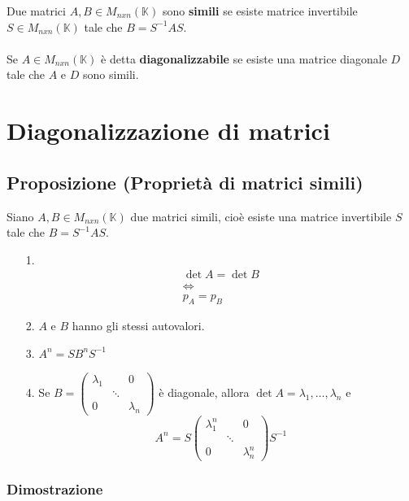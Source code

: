 \documentclass[12pt]{article}
\begin{document}
Due matrici $A, B \in M_{nxn}(\mathbb{K})$ sono \textbf{simili} se esiste matrice invertibile $S \in M_{nxn}(\mathbb{K})$ tale che $B = S^{-1}AS$.
\\\\
Se $A \in M_{nxn} (\mathbb{K})$ è detta \textbf{diagonalizzabile} se esiste una matrice diagonale $D$ tale che $A$ e $D$ sono simili.

\pagebreak

\section{Diagonalizzazione di matrici}

\subsection{Proposizione (Proprietà di matrici simili)}

Siano $A, B \in M_{nxn}(\mathbb{K})$ due matrici simili, cioè esiste una matrice invertibile $S$ tale che $B = S^{-1}AS$.

\begin{enumerate}
    \item[1.] \[\begin{matrix}
        \det{A} = \det{B}\\
        \iff\\
        p_A = p_B
    \end{matrix}\]
    \item[2.] $A$ e $B$ hanno gli stessi autovalori.
    \item[3.] $A^n = SB^{n}S^{-1}$
    \item[4.] Se $B = \begin{pmatrix}
        \lambda_1 & & 0\\
         & \ddots &\\
         0 & & \lambda_n
    \end{pmatrix}$ è diagonale, allora $\det{A} = \lambda_1, \dots, \lambda_n$ e \[A^n = S\begin{pmatrix}
        \lambda_1^{n} & & 0\\
         & \ddots &\\
         0 & & \lambda_n^n
    \end{pmatrix}S^{-1}\]
\end{enumerate}

\subsubsection{Dimostrazione}
\end{document}
